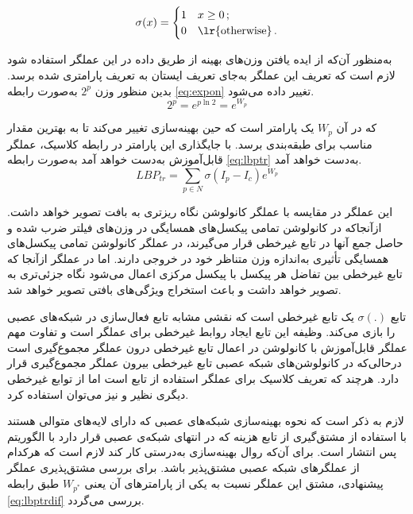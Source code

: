 	\[ \sigma(x) = 
	\begin{cases} 1  & \text{$x \geq 0 $}\,; \\
		0  & \text{\lr{otherwise}}\,.
	\end{cases} \]


به‌منظور آن‌که از ایده یافتن وزن‌های بهینه از طریق داده در این عملگر استفاده شود لازم است که تعریف این عملگر به‌جای تعریف ایستان به تعریف پارامتری شده برسد. بدین منظور وزن
$2^p$
 به‌صورت رابطه
\ref{eq:expon}
 تغییر داده می‌شود.
\begin{equation}\label{eq:expon}
	2^p=e^{p\ln{2}}=e^{W_p}
\end{equation}

که در آن 
$W_p$
 یک پارامتر است که حین بهینه‌سازی تغییر می‌کند تا به بهترین مقدار مناسب برای طبقه‌بندی برسد. با جایگذاری این پارامتر در رابطه  کلاسیک، عملگر  قابل‌آموزش به‌دست خواهد آمد به‌صورت رابطه
\ref{eq:lbptr}
به‌دست خواهد آمد.
\begin{equation}\label{eq:lbptr}
		LBP_{tr}=\sum_{p\in N}\sigma(I_p-I_c)e^{W_p} 
\end{equation}

این عملگر در مقایسه با عملگر کانولوشن نگاه ریزتری به بافت تصویر خواهد داشت. از‌آنجا‌که در کانولوشن تمامی پیکسل‌های همسایگی در وزن‌های فیلتر ضرب شده و حاصل جمع آنها در تابع غیر‌خطی قرار می‌گیرند، در عملگر کانولوشن تمامی پیکسل‌های همسایگی تأثیری به‌اندازه وزن متناظر خود در خروجی دارند. اما در عملگر  ازآنجا که تابع غیرخطی بین تفاضل هر پیکسل با پیکسل مرکزی اعمال می‌شود نگاه جزئی‌تری به تصویر خواهد داشت و باعث استخراج ویژگی‌های بافتی تصویر خواهد شد. 

تابع 
$\sigma(.)$
 یک تابع غیرخطی است که نقشی مشابه تابع فعال‌سازی
  در شبکه‌های عصبی را بازی می‌کند. وظیفه این تابع ایجاد روابط غیرخطی برای عملگر است و تفاوت مهم عملگر  قابل‌آموزش با کانولوشن در اعمال تابع غیرخطی درون عملگر مجموع‌گیری است در‌حالی‌که در کانولوشن‌های شبکه عصبی تابع غیر‌خطی بیرون عملگر  مجموع‌گیری قرار دارد. هر‌چند که تعریف کلاسیک برای عملگر  استفاده از تابع  است اما از توابع غیر‌خطی دیگری نظیر  و  نیز می‌توان استفاده کرد.
  
لازم به ذکر است که نحوه بهینه‌سازی شبکه‌های عصبی که دارای لایه‌های متوالی هستند با استفاده از مشتق‌گیری از تابع هزینه که در انتهای شبکه‌ی عصبی قرار دارد با الگوریتم پس انتشار
 است. برای آن‌که روال بهینه‌سازی به‌درستی کار کند لازم است که هر‌کدام از عملگرهای شبکه عصبی مشتق‌پذیر باشد. برای بررسی مشتق‌پذیری عملگر پیشنهادی، مشتق این عملگر نسبت به یکی از پارامتر‌های آن یعنی 
$W_{p^*}$
طبق رابطه
\ref{eq:lbptrdif}
بررسی می‌گردد.
 
